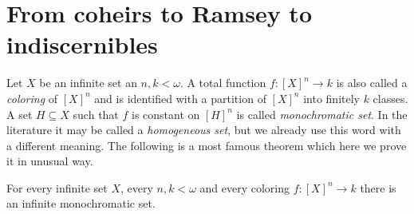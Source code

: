 \documentclass[creche.tex]{subfiles}
\begin{document}


% 



% 



\section{From coheirs to Ramsey to indiscernibles}


Let $X$ be an infinite set an $n,k<\omega$. A total function $f:[X]^n\to k$ is also called a \emph{coloring\/} of $[X]^n$ and is identified with a partition of $[X]^n$ into finitely $k$ classes. A set $H\subseteq X$ such that $f$ is constant on $[H]^n$ is called \emph{monochromatic set}. In the literature it may be called a \emph{homogeneous set}, but we already use this word with a different meaning. The following is a most famous theorem which here we prove it in unusual way.


\begin{proposition}
For every infinite set $X$, every $n,k<\omega$ and every coloring $f:[X]^n\to k$ there is an infinite monochromatic set.
\end{proposition}
\end{document}
